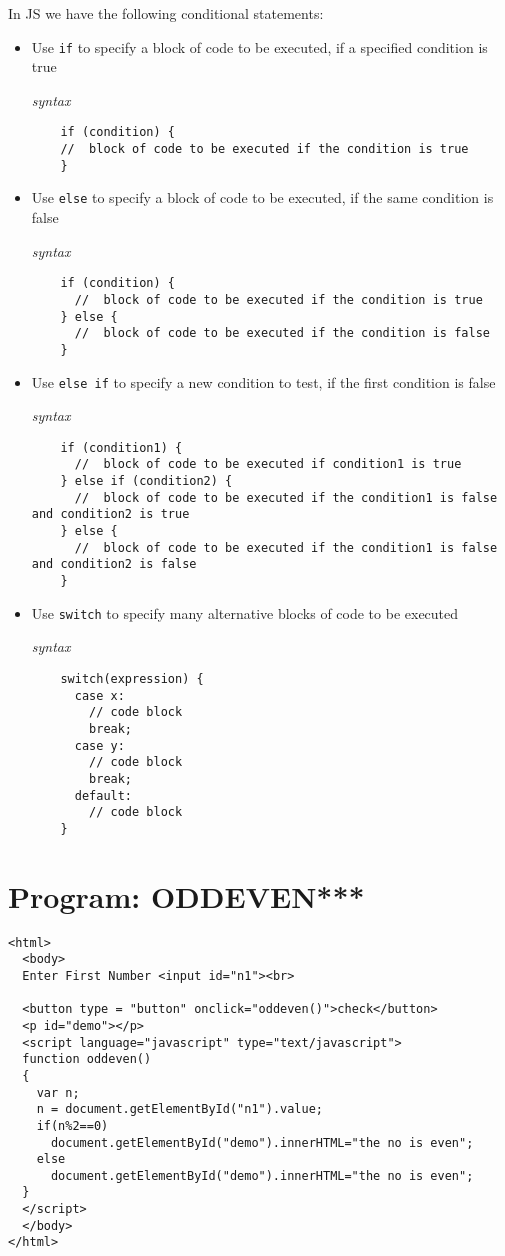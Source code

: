 In JS we have the following conditional statements:
\begin{itemize}
  \item Use \texttt{if} to specify a block of code to be executed, if a specified condition is true
    
    \textit{syntax}
    \begin{lstlisting}
    if (condition) {
    //  block of code to be executed if the condition is true
    }
    \end{lstlisting}
  \item Use \texttt{else} to specify a block of code to be executed, if the same condition is false
    
    \textit{syntax}
    \begin{lstlisting}
    if (condition) {
      //  block of code to be executed if the condition is true
    } else {
      //  block of code to be executed if the condition is false
    }
    \end{lstlisting}
  \item Use \texttt{else if} to specify a new condition to test, if the first condition is false
    
    \textit{syntax}
    \begin{lstlisting}
    if (condition1) {
      //  block of code to be executed if condition1 is true
    } else if (condition2) {
      //  block of code to be executed if the condition1 is false and condition2 is true
    } else {
      //  block of code to be executed if the condition1 is false and condition2 is false
    }
    \end{lstlisting}
  \item Use \texttt{switch} to specify many alternative blocks of code to be executed
    
    \textit{syntax}
    \begin{lstlisting}
    switch(expression) {
      case x:
        // code block
        break;
      case y:
        // code block
        break;
      default:
        // code block
    }
    \end{lstlisting}
\end{itemize}

\section{Program: ODDEVEN***}
\begin{lstlisting}
<html>
  <body>
  Enter First Number <input id="n1"><br>

  <button type = "button" onclick="oddeven()">check</button>
  <p id="demo"></p>
  <script language="javascript" type="text/javascript">
  function oddeven()
  {
    var n;
    n = document.getElementById("n1").value;
    if(n%2==0)
      document.getElementById("demo").innerHTML="the no is even";
    else
      document.getElementById("demo").innerHTML="the no is even";
  }
  </script>
  </body>
</html>
\end{lstlisting}
